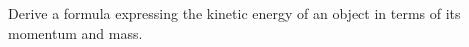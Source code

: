 Derive a formula expressing the kinetic energy of an
        object in terms of its momentum and mass.\answercheck
